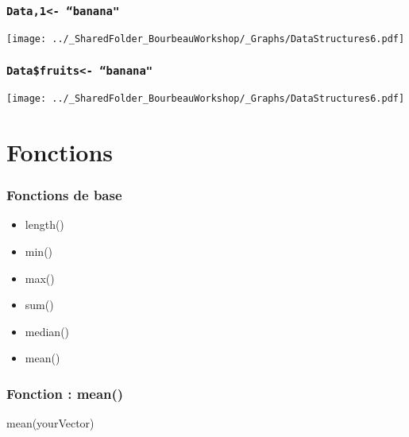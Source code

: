 \documentclass{beamer}
\begin{document}
    \begin{frame}
        \frametitle{\texttt{Data,1\rbrack  <- ``banana"}} \vspace{0.6cm}
        \begin{center}
            \texttt{[image: ../\_SharedFolder\_BourbeauWorkshop/\_Graphs/DataStructures6.pdf]}
        \end{center}
    \end{frame}
    
    \begin{frame}
        \frametitle{\texttt{Data\$fruits\rbrack <- ``banana"}} \vspace{0.6cm}
        \begin{center}
            \texttt{[image: ../\_SharedFolder\_BourbeauWorkshop/\_Graphs/DataStructures6.pdf]}
        \end{center}
    \end{frame}




\section{Fonctions}

    \begin{frame}
        \frametitle{Fonctions de base \R}
        \begin{itemize}
            \item length()
            \item min()
            \item max()
            \item sum()
            \item median()
            \item mean()
        \end{itemize}
    \end{frame}
        
    \begin{frame}[fragile=singleslide]
        \frametitle{Fonction \R : mean()}
        \begin{code}
mean(yourVector)
        \end{code}
    \end{frame}
    
\end{document}
